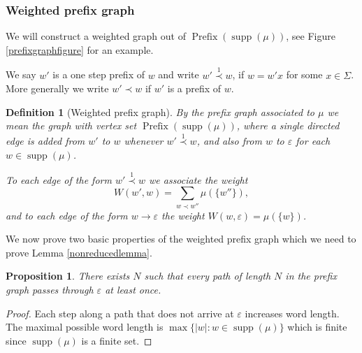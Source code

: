 \documentclass{article}
\newtheorem{proposition}{Proposition}
\newtheorem{definition}{Definition}
\DeclareMathOperator{\supp}{supp}
\DeclareMathOperator{\prefix}{Prefix}
\begin{document}
\subsubsection{Weighted prefix graph}

We will construct a weighted graph out of \(\prefix(\supp(\mu))\), see Figure \ref{prefixgraphfigure} for an example. 

We say \(w'\) is a one step prefix of \(w\) and write \(w' \overset{1}{\prec} w\), if \(w = w'x\) for some \(x \in \Sigma\). More generally we write \(w' \prec w\) if \(w'\) is a prefix of \(w\).

\begin{definition}[Weighted prefix graph]
 By the prefix graph associated to \(\mu\) we mean the graph with vertex set \(\prefix(\supp(\mu))\), where a single directed edge is added from \(w'\) to \(w\) whenever \(w' \overset{1}{\prec} w\), and also from \(w\) to \(\varepsilon\) for each \(w \in \supp(\mu)\).

 To each edge of the form \(w' \overset{1}{\prec} w\) we associate the weight 
\[W(w',w) = \sum\limits_{w \prec w''}\mu(\lbrace w''\rbrace),\]
and to each edge of the form \(w \rightarrow \varepsilon\) the weight \(W(w,\varepsilon) = \mu(\lbrace w\rbrace)\).
\end{definition}

We now prove two basic properties of the weighted prefix graph which we need to prove Lemma \ref{nonreducedlemma}.

\begin{proposition}
 There exists \(N\) such that every path of length \(N\) in the prefix graph passes through \(\varepsilon\) at least once.
\end{proposition}
\begin{proof}
 Each step along a path that does not arrive at \(\varepsilon\) increases word length.  The maximal possible word length is \(\max\lbrace |w|: w \in \supp(\mu)\rbrace\) which is finite since \(\supp(\mu)\) is a finite set.
\end{proof}
\end{document}
